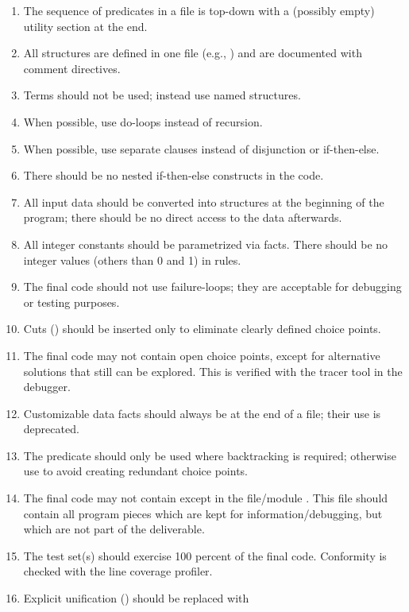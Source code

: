 \begin{enumerate}
\item  The sequence of predicates in a file is top-down with a (possibly empty)
  utility section at the end.
\item  All structures are defined in one file (e.g.,
  ) and are documented with comment directives.
\item  Terms should not be used; instead use named
  structures.
\item  When possible, use do-loops instead of recursion.
\item  When possible, use separate clauses instead of
  disjunction or if-then-else.
\item  There should be no nested if-then-else constructs in
  the code.
\item  All input data should be converted into structures at the beginning of
  the program; there should be no direct access to the data afterwards.
\item  All integer constants should be parametrized via
  facts. There should be no integer values (others than 0 and 1) in rules.
\item  The final code should not use failure-loops; they are
  acceptable for debugging or testing purposes.
\item  Cuts (\notation{!}) should be inserted only to eliminate
  clearly defined choice points.
\item  The final code may not contain open choice points, except for alternative
  solutions that still can be explored. This is verified with the tracer tool in
  the debugger.
\item  Customizable data facts should always be at the end of a file; their use
  is deprecated.
\item  The predicate  should only be used
  where backtracking is required; otherwise use
   to avoid creating redundant choice
  points.
\item  The final code may not contain  except in the
  file/module . This file should contain all program
  pieces which are kept for information/debugging, but which are not part of the
  deliverable.
\item  The test set(s) should exercise 100 percent of the final code. Conformity
  is checked with the line coverage profiler.
\item  Explicit unification () should be replaced with

\end{enumerate}
